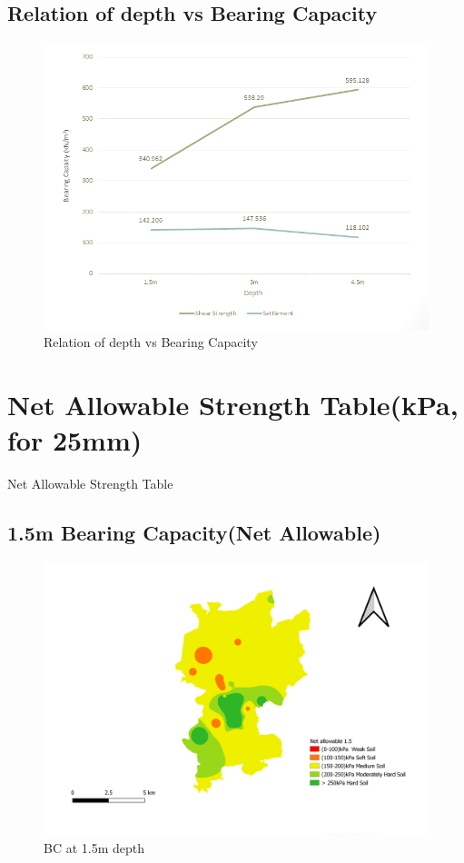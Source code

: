 \begin{landscape}
\section{Relation of depth vs Bearing Capacity}
\begin{figure}[!hbt]
\centering
\includegraphics[width=0.8\linewidth, height=0.8\textheight,keepaspectratio]{images/main/d_vs_bc.png}
\caption{Relation of depth vs Bearing Capacity}
\end{figure}
\pagebreak
\end{landscape}

\section{Net Allowable Strength Table(kPa, for 25mm)}
\begin{table}[!h]
\caption{Net Allowable Strength Table}

\end{table}
\pagebreak

\begin{landscape}
\section{1.5m Bearing Capacity(Net Allowable)}
\begin{figure}[!hbt]
\centering
\includegraphics[width=0.8\linewidth, height=0.8\textheight,keepaspectratio]{in/map/na_1_5.png}
\caption{BC at 1.5m depth}
\end{figure}
\pagebreak
\end{landscape}

